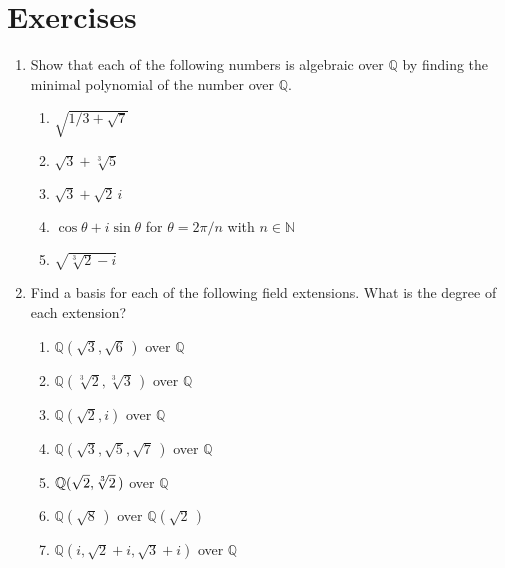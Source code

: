  
\section*{Exercises}
\exrule

 
{\small
\begin{enumerate}


\item
Show that each of the following numbers is algebraic over ${\mathbb Q}$
by finding the minimal polynomial of the number over ${\mathbb Q}$.
\begin{enumerate}

 \item
$\sqrt{ 1/3 + \sqrt{7} }$

 \item
$\sqrt{ 3} + \sqrt[3]{5}$

 \item
$\sqrt{3} + \sqrt{2}\, i$

 \item
$\cos \theta + i \sin \theta$ for $\theta = 2 \pi /n$ with $n \in
{\mathbb N}$

 \item
$\sqrt{ \sqrt[3]{2} - i }$

\end{enumerate}


\item
Find a basis for each of the following field extensions. What is the
degree of each extension?
\begin{enumerate}
 
 \item
${\mathbb Q}( \sqrt{3}, \sqrt{6}\, )$ over ${\mathbb Q}$
 
 \item
${\mathbb Q}( \sqrt[3]{2}, \sqrt[3]{3}\, )$ over ${\mathbb Q}$

 \item
${\mathbb Q}( \sqrt{2}, i)$ over ${\mathbb Q}$

 \item
${\mathbb Q}( \sqrt{3}, \sqrt{5}, \sqrt{7}\, )$ over ${\mathbb Q}$
 
 \item
${\mathbb Q}( \sqrt{2}, \root 3 \of{2}\, )$ over ${\mathbb Q}$

 \item
${\mathbb Q}( \sqrt{8}\, )$ over ${\mathbb Q}(\sqrt{2}\, )$ 

 \item
${\mathbb Q}(i, \sqrt{2} +i, \sqrt{3} + i )$ over ${\mathbb Q}$


\end{enumerate}
\end{enumerate}}
